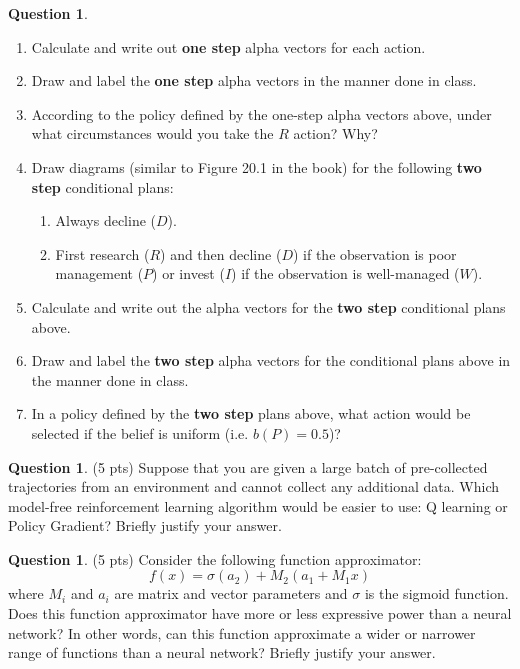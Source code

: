 \documentclass{article}
\theoremstyle{definition}
\newtheorem{question}[thm]{Question}
\begin{document}
\begin{question}
    \begin{enumerate}[label=\alph*)]
        \item Calculate and write out \textbf{one step} alpha vectors for each action.
        \item Draw and label the \textbf{one step} alpha vectors in the manner done in class.
        \item According to the policy defined by the one-step alpha vectors above, under what circumstances would you take the $R$ action? Why?
        \item Draw diagrams (similar to Figure 20.1 in the book) for the following \textbf{two step} conditional plans:
            \begin{enumerate}
                \item Always decline ($D$).
                \item First research ($R$) and then decline ($D$) if the observation is poor management ($P$) or invest ($I$) if the observation is well-managed ($W$).
            \end{enumerate}
        \item Calculate and write out the alpha vectors for the \textbf{two step} conditional plans above.
        \item Draw and label the \textbf{two step} alpha vectors for the conditional plans above in the manner done in class.
        \item In a policy defined by the \textbf{two step} plans above, what action would be selected if the belief is uniform (i.e. $b(P) = 0.5$)?
    \end{enumerate}

\end{question}

\begin{question} (5 pts)
    Suppose that you are given a large batch of pre-collected trajectories from an environment and cannot collect any additional data. Which model-free reinforcement learning algorithm would be easier to use: Q learning or Policy Gradient? Briefly justify your answer.
\end{question}

\begin{question} (5 pts)
    Consider the following function approximator: $$f(x) = \sigma(a_2) + M_2(a_1 + M_1 x)$$ where $M_i$ and $a_i$ are matrix and vector parameters and $\sigma$ is the sigmoid function. Does this function approximator have more or less expressive power than a neural network? In other words, can this function approximate a wider or narrower range of functions than a neural network? Briefly justify your answer.
\end{question}
\end{document}
